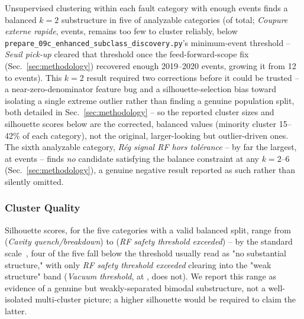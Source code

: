 Unsupervised clustering within each fault category with enough events finds a balanced $k=2$ substructure in five of \MetricZeroNinecEnhancedSubclassDiscoveryNCategoriesAnalyzed{} analyzable categories (of \MetricZeroNinecEnhancedSubclassDiscoveryNCategoriesTotal{} total; \textit{Coupure externe rapide}, \MetricZeroZeroDataAttritionChainGtPassingCoupureExterneRapide{} events, remains too few to cluster reliably, below \texttt{prepare\_09c\_enhanced\_subclass\_discovery.py}'s minimum-event threshold -- \textit{Seuil pick-up} cleared that threshold once the feed-forward-scope fix (Sec.~\ref{sec:methodology}) recovered enough 2019--2020 events, growing it from 12 to \MetricZeroZeroDataAttritionChainGtPassingSeuilPickUp{} events). %
This $k=2$ result required two corrections before it could be trusted -- a near-zero-denominator feature bug and a silhouette-selection bias toward isolating a single extreme outlier rather than finding a genuine population split, both detailed in Sec.~\ref{sec:methodology} -- so the reported cluster sizes and silhouette scores below are the corrected, balanced values (minority cluster 15--42\% of each category), not the original, larger-looking but outlier-driven ones. %
The sixth analyzable category, \textit{Rég signal RF hors tolérance} -- by far the largest, at \MetricZeroZeroDataAttritionChainGtPassingRGSignalRfHorsTolRance{} events -- finds \emph{no} candidate satisfying the balance constraint at any $k=2$--6 (Sec.~\ref{sec:methodology}), a genuine negative result reported as such rather than silently omitted.

\subsubsection{Cluster Quality}

Silhouette scores, for the five categories with a valid balanced split, range from \MetricZeroNinecEnhancedSubclassDiscoveryCavityQuenchBreakdownSilhouette{} (\textit{Cavity quench/breakdown}) to \MetricZeroNinecEnhancedSubclassDiscoveryRfSafetyThresholdExceededSilhouette{} (\textit{RF safety threshold exceeded}) -- by the standard scale~\cite{silhouette_interpretation}, four of the five fall below the threshold usually read as "no substantial structure," with only \textit{RF safety threshold exceeded} clearing into the "weak structure" band (\textit{Vacuum threshold}, at \MetricZeroNinecEnhancedSubclassDiscoveryVacuumThresholdSilhouette, does not). We report this range as evidence of a genuine but weakly-separated bimodal substructure, not a well-isolated multi-cluster picture; a higher silhouette would be required to claim the latter.

